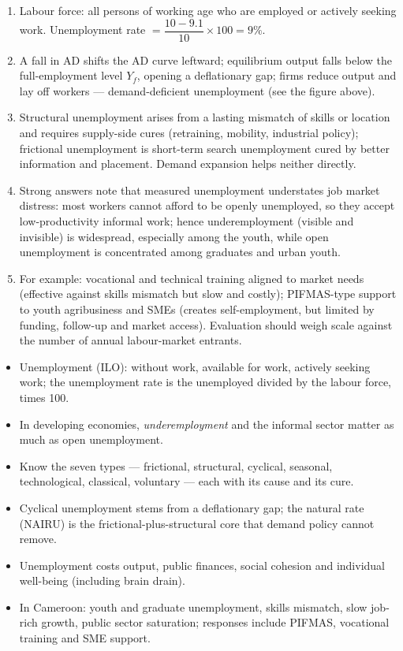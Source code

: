 \documentclass[11pt]{article}
\begin{document}
\begin{corrige}[Exercise 6]
\begin{enumerate}
\item Labour force: all persons of working age who are employed or actively seeking work. Unemployment rate $= \dfrac{10 - 9.1}{10}\times 100 = 9\%$.
\item A fall in AD shifts the AD curve leftward; equilibrium output falls below the full-employment level $Y_f$, opening a deflationary gap; firms reduce output and lay off workers — demand-deficient unemployment (see the figure above).
\item Structural unemployment arises from a lasting mismatch of skills or location and requires supply-side cures (retraining, mobility, industrial policy); frictional unemployment is short-term search unemployment cured by better information and placement. Demand expansion helps neither directly.
\item Strong answers note that measured unemployment understates job market distress: most workers cannot afford to be openly unemployed, so they accept low-productivity informal work; hence underemployment (visible and invisible) is widespread, especially among the youth, while open unemployment is concentrated among graduates and urban youth.
\item For example: vocational and technical training aligned to market needs (effective against skills mismatch but slow and costly); PIFMAS-type support to youth agribusiness and SMEs (creates self-employment, but limited by funding, follow-up and market access). Evaluation should weigh scale against the number of annual labour-market entrants.
\end{enumerate}
\end{corrige}

\begin{aretenir}
\begin{itemize}
\item Unemployment (ILO): without work, available for work, actively seeking work; the unemployment rate is the unemployed divided by the labour force, times 100.
\item In developing economies, \emph{underemployment} and the informal sector matter as much as open unemployment.
\item Know the seven types — frictional, structural, cyclical, seasonal, technological, classical, voluntary — each with its cause and its cure.
\item Cyclical unemployment stems from a deflationary gap; the natural rate (NAIRU) is the frictional-plus-structural core that demand policy cannot remove.
\item Unemployment costs output, public finances, social cohesion and individual well-being (including brain drain).
\item In Cameroon: youth and graduate unemployment, skills mismatch, slow job-rich growth, public sector saturation; responses include PIFMAS, vocational training and SME support.
\end{itemize}
\end{aretenir}
\end{document}
